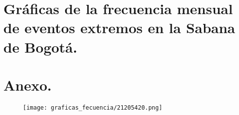 \appendix
\clearpage
\addappheadtotoc
\appendixpage

\chapter{Gráficas de la frecuencia mensual de eventos extremos en la Sabana de Bogotá.}
\label{anexo:gra_mensual_eventos_sb}



\chapter{Anexo. }


\begin{figure}[H]
\centering
\texttt{[image: graficas\_fecuencia/21205420.png]}
\end{figure}
